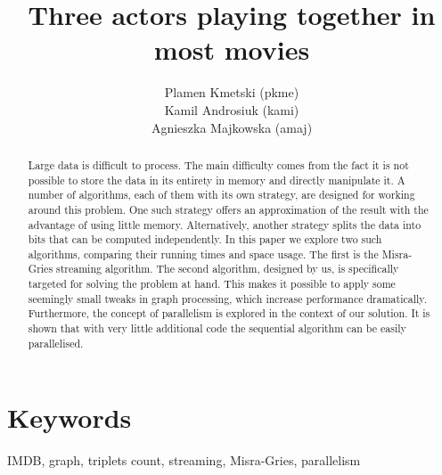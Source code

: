 \documentclass[11pt]{article} %
\title{Three actors playing together in most movies}
\author{Plamen Kmetski (pkme)\\Kamil Androsiuk (kami)\\Agnieszka Majkowska (amaj)}
\begin{document}
\maketitle

\begin{abstract}

Large data is difficult to process. The main difficulty comes from the fact it is not possible to store the data in its entirety in memory and directly manipulate it. A number of algorithms, each of them with its own strategy, are designed for working around this problem. One such strategy offers an approximation of the result with the advantage of using little memory. Alternatively, another strategy splits the data into bits that can be computed independently. In this paper we explore two such algorithms, comparing their running times and space usage. The first is the Misra-Gries streaming algorithm. The second algorithm, designed by us, is specifically targeted for solving the problem at hand. This makes it possible to apply some seemingly small tweaks in graph processing, which increase performance dramatically. Furthermore, the concept of parallelism is explored in the context of our solution. It is shown that with very little additional code the sequential algorithm can be easily parallelised.

\end{abstract}

\section*{Keywords}
\label{Keywords}
IMDB, graph, triplets count, streaming, Misra-Gries, parallelism









\end{document}
